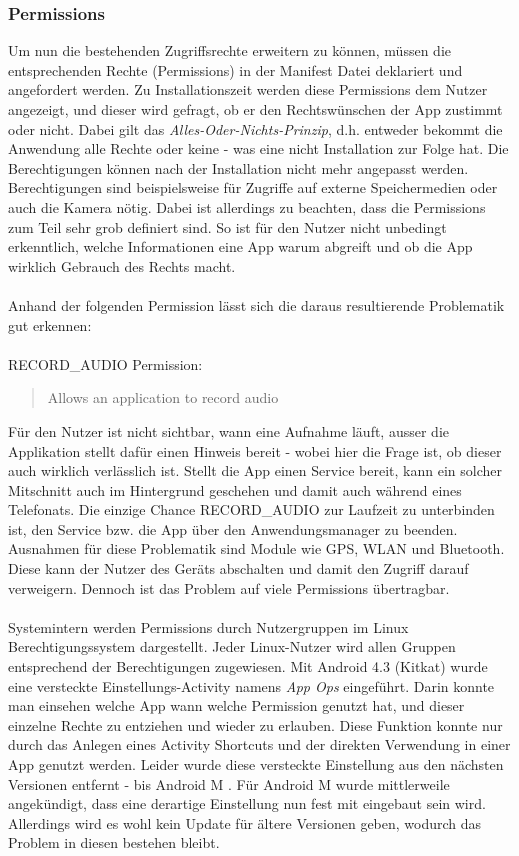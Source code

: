 	\subsubsection{Permissions}
	Um nun die bestehenden Zugriffsrechte erweitern zu können, müssen die entsprechenden Rechte (Permissions) in der Manifest Datei deklariert und angefordert werden. Zu Installationszeit werden diese Permissions dem Nutzer angezeigt, und dieser wird gefragt, ob er den Rechtswünschen der App zustimmt oder nicht. Dabei gilt das \textit{Alles-Oder-Nichts-Prinzip}, d.h. entweder bekommt die Anwendung alle Rechte oder keine - was eine nicht Installation zur Folge hat. Die Berechtigungen können nach der Installation nicht mehr angepasst werden. Berechtigungen sind beispielsweise für Zugriffe auf externe Speichermedien oder auch die Kamera nötig. Dabei ist allerdings zu beachten, dass die Permissions zum Teil sehr grob definiert sind. So ist für den Nutzer nicht unbedingt erkenntlich, welche Informationen eine App warum abgreift und ob die App wirklich Gebrauch des Rechts macht.\\\\
	Anhand der folgenden Permission lässt sich die daraus resultierende Problematik gut erkennen:\\\\
	RECORD\_AUDIO Permission:
	\begin{quote}
	Allows an application to record audio \cite{RECORD_AUDIO}
	\end{quote} 
	Für den Nutzer ist nicht sichtbar, wann eine Aufnahme läuft, ausser die Applikation stellt dafür einen Hinweis bereit - wobei hier die Frage ist, ob dieser auch wirklich verlässlich ist. Stellt die App einen Service bereit, kann ein solcher Mitschnitt auch im Hintergrund geschehen und damit auch während eines Telefonats. Die einzige Chance RECORD\_AUDIO zur Laufzeit zu unterbinden ist, den Service bzw. die App über den Anwendungsmanager zu beenden.	Ausnahmen für diese Problematik sind Module wie GPS, WLAN und Bluetooth. Diese kann der Nutzer des Geräts abschalten und damit den Zugriff darauf verweigern.
	Dennoch ist das Problem auf viele Permissions übertragbar.\\\\
	Systemintern werden Permissions durch Nutzergruppen im Linux Berechtigungssystem dargestellt\cite[S. 28]{Drake2014}. Jeder Linux-Nutzer wird allen Gruppen entsprechend der Berechtigungen zugewiesen.
	Mit Android 4.3 (Kitkat) wurde eine versteckte Einstellungs-Activity namens \textit{App Ops} eingeführt. Darin konnte man einsehen welche App wann welche Permission genutzt hat, und dieser einzelne Rechte zu entziehen und wieder zu erlauben. Diese Funktion konnte nur durch das Anlegen eines Activity Shortcuts und der direkten Verwendung in einer App genutzt werden. Leider wurde diese versteckte Einstellung aus den nächsten Versionen entfernt - bis Android M \cite{HiddenActivity}. Für Android M wurde mittlerweile angekündigt, dass eine derartige Einstellung nun fest mit eingebaut sein wird\cite{AndroidMPermission}. Allerdings wird es wohl kein Update für ältere Versionen geben, wodurch das Problem in diesen bestehen bleibt.
	
